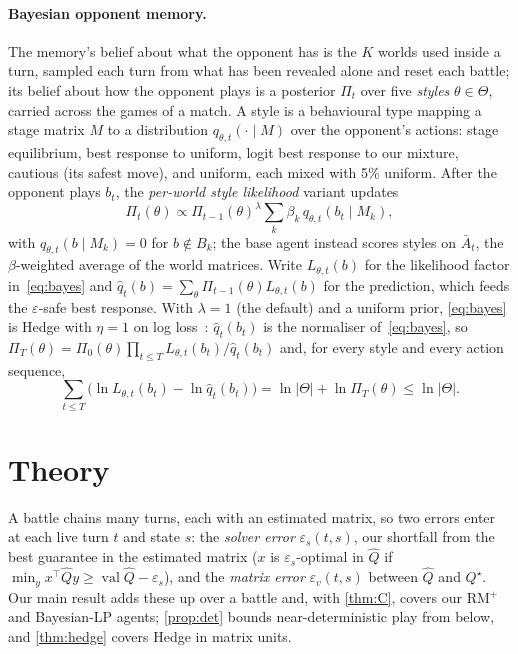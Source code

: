 \documentclass[10pt]{article}
\theoremstyle{tplain}
\theoremstyle{tdef}
\theoremstyle{trem}
\newcommand{\epss}{\varepsilon_s}
\newcommand{\epsv}{\varepsilon_v}
\newcommand{\Qhat}{\hat Q}
\newcommand{\Qstar}{Q^\star}
\newcommand{\Abar}{\bar A}
\newcommand{\qhat}{\hat q}
\DeclareMathOperator{\val}{val}
\begin{document}
\paragraph{Bayesian opponent memory.}\label{sec:memory} The memory's belief about what the opponent has is the $K$ worlds used inside a turn, sampled each turn from what has been revealed alone and reset each battle; its belief about how the opponent plays is a posterior $\Pi_t$ over five \emph{styles} $\theta\in\Theta$, carried across the games of a match. A style is a behavioural type mapping a stage matrix $M$ to a distribution $q_{\theta,t}(\cdot\mid M)$ over the opponent's actions: stage equilibrium, best response to uniform, logit best response to our mixture, cautious (its safest move), and uniform, each mixed with 5\% uniform. After the opponent plays $b_t$, the \emph{per-world style likelihood} variant updates
\begin{equation}\label{eq:bayes}
\Pi_t(\theta)\propto\Pi_{t-1}(\theta)^\lambda\textstyle\sum_{k}\beta_k\,q_{\theta,t}(b_t\mid M_k),
\end{equation}
with $q_{\theta,t}(b\mid M_k)=0$ for $b\notin B_k$; the base agent instead scores styles on $\Abar_t$, the $\beta$-weighted average of the world matrices. Write $L_{\theta,t}(b)$ for the likelihood factor in~\eqref{eq:bayes} and $\qhat_t(b)=\sum_\theta\Pi_{t-1}(\theta)L_{\theta,t}(b)$ for the prediction, which feeds the $\varepsilon$-safe best response. With $\lambda=1$ (the default) and a uniform prior, \eqref{eq:bayes} is Hedge with $\eta=1$ on log loss~\cite[\S9.2]{CBL06}: $\qhat_t(b_t)$ is the normaliser of~\eqref{eq:bayes}, so $\Pi_T(\theta)=\Pi_0(\theta)\prod_{t\le T}L_{\theta,t}(b_t)/\qhat_t(b_t)$ and, for every style and every action sequence,
\begin{equation}\label{eq:bayeshedge}
\textstyle\sum_{t\le T}\big(\ln L_{\theta,t}(b_t)-\ln\qhat_t(b_t)\big)=\ln|\Theta|+\ln\Pi_T(\theta)\le\ln|\Theta|.
\end{equation}

\section{Theory}
\label{sec:theory}
A battle chains many turns, each with an estimated matrix, so two errors enter at each live turn $t$ and state $s$: the \emph{solver error} $\epss(t,s)$, our shortfall from the best guarantee in the estimated matrix ($x$ is $\epss$-optimal in $\Qhat$ if $\min_yx^\top\Qhat y\ge\val\Qhat-\epss$), and the \emph{matrix error} $\epsv(t,s)$ between $\Qhat$ and $\Qstar$. Our main result adds these up over a battle and, with \cref{thm:C}, covers our RM$^+$ and Bayesian-LP agents; \cref{prop:det} bounds near-deterministic play from below, and \cref{thm:hedge} covers Hedge in matrix units.
\end{document}
